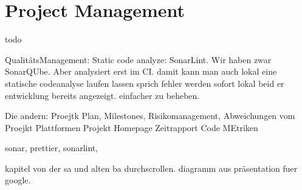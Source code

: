 \section{Project Management}
todo

QualitätsManagement: Static code analyze: SonarLint. \cite{sonar-lint}
Wir haben zwar SonarQUbe. Aber analysiert erst im CI.
damit kann man auch lokal eine statische codeanalyse laufen lassen sprich fehler werden sofort lokal beid er
entwicklung bereits angezeigt. einfacher zu beheben.


Die andern:
Proejtk Plan, Milestones, Risikomanagement, Abweichungen vom Proejkt Plattformen
Projekt Homepage
Zeitrapport
Code MEtriken



sonar, prettier, sonarlint,

kapitel von der sa und alten ba durchscrollen.
diagramm aus präsentation fuer google. 
